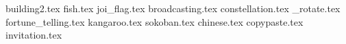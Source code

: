 \documentclass[11pt,a4paper,oneside,arabic,korean]{article}
\begin{document}

{building2.tex}
{fish.tex}
{joi_flag.tex}
{broadcasting.tex}
{constellation.tex}
{_rotate.tex}
{fortune_telling.tex}
{kangaroo.tex}
{sokoban.tex}
{chinese.tex}
{copypaste.tex}
{invitation.tex}
\end{document}
